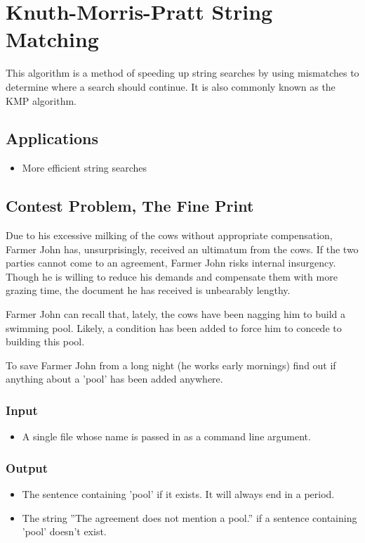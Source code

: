\section{Knuth-Morris-Pratt String Matching}
This algorithm is a method of speeding up string searches by using mismatches to determine where a search should continue.
It is also commonly known as the KMP algorithm.

\subsection{Applications}
\begin{itemize}
	\item{More efficient string searches}
\end{itemize}

\subsection{Contest Problem, The Fine Print}
Due to his excessive milking of the cows without appropriate compensation, Farmer John has, unsurprisingly, received an ultimatum from the cows.
If the two parties cannot come to an agreement, Farmer John risks internal insurgency.
Though he is willing to reduce his demands and compensate them with more grazing time, the document he has received is unbearably lengthy.

Farmer John can recall that, lately, the cows have been nagging him to build a swimming pool.
Likely, a condition has been added to force him to concede to building this pool.

To save Farmer John from a long night (he works early mornings) find out if anything about a 'pool' has been added anywhere.

\subsubsection{Input}
\begin{itemize}
	\item A single file whose name is passed in as a command line argument.
\end{itemize}

\subsubsection{Output}
\begin{itemize}
	\item The sentence containing 'pool' if it exists. It will always end in a period.
	\item The string ''The agreement does not mention a pool.'' if a sentence containing 'pool' doesn't exist.
\end{itemize}
